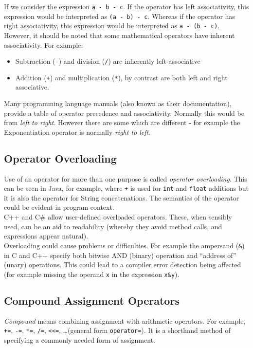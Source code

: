 If we consider the expression \verb|a - b - c|. If the operator has left associativity, this expression would be interpreted as \verb|(a - b) - c|. Whereas if the operator has right associativity, this expression would be interpreted as \verb|a - (b - c)|.\\

However, it should be noted that some mathematical operators have inherent associativity. For example:
\begin{itemize}
    \item Subtraction (\verb|-|) and division (\verb|/|) are inherently left-associative
    \item Addition (\verb|+|) and multiplication (\verb|*|), by contrast are both left and right associative.
\end{itemize}

Many programming language manuals (also known as their documentation), provide a table of operator precedence and associativity. Normally this would be from \textit{left to right}. However there are some which are different - for example the Exponentiation operator is normally \textit{right to left}. 

\subsection{Operator Overloading}
Use of an operator for more than one purpose is called \textit{operator overloading}. This can be seen in Java, for example, where \verb|+| is used for \verb|int| and \verb|float| additions but it is also the operator for String concatenations. The semantics of the operator could be evident in program context.\\

C++ and C\# allow user-defined overloaded operators. These, when sensibly used, can be an aid to readability (whereby they avoid method calls, and expressions appear natural).\\

Overloading could cause problems or difficulties. For example the ampersand (\verb|&|) in C and C++ specify both bitwise AND (binary) operation and ``address of'' (unary) operations. This could lead to a compiler error detection being affected (for example missing the operand \verb|x| in the expression \verb|x&y|). 

\subsection{Compound Assignment Operators}
\textit{Compound} means combining assignment with arithmetic operators. For example, \verb|+=|, \verb|-=|, \verb|*=|, \verb|/=|, \verb|<<=|, \dots (general form \verb|operator=|). It is a shorthand method of specifying a commonly needed form of assignment.\\

